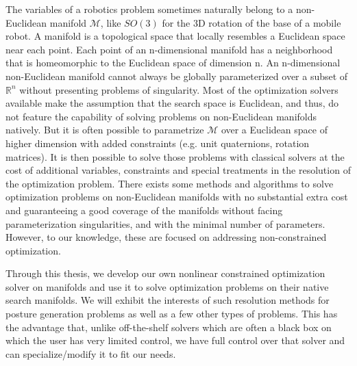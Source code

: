 The variables of a robotics problem sometimes naturally belong to a non-Euclidean manifold $\mathcal{M}$, like $SO(3)$ for the 3D rotation of the base of a mobile robot.
A manifold is a topological space that locally resembles a Euclidean space near each point.
Each point of an n-dimensional manifold has a neighborhood that is homeomorphic to the Euclidean space of dimension n.
An n-dimensional non-Euclidean manifold cannot always be globally parameterized over a subset of $\mathbb{R}^n$ without presenting problems of singularity.
Most of the optimization solvers available make the assumption that the search space is Euclidean, and thus, do not feature the capability of solving problems on non-Euclidean manifolds natively.
But it is often possible to parametrize $\mathcal{M}$ over a Euclidean space of higher dimension with added constraints (e.g. unit quaternions, rotation matrices).
It is then possible to solve those problems with classical solvers at the cost of additional variables, constraints and special treatments in the resolution of the optimization problem.
There exists some methods and algorithms to solve optimization problems on non-Euclidean manifolds with no substantial extra cost and guaranteeing a good coverage of the manifolds without facing parameterization singularities, and with the minimal number of parameters.
However, to our knowledge, these are focused on addressing non-constrained optimization.

Through this thesis, we develop our own nonlinear constrained optimization solver on manifolds and use it to solve optimization problems on their native search manifolds. We will exhibit the interests of such resolution methods for posture generation problems as well as a few other types of problems.
This has the advantage that, unlike off-the-shelf solvers which are often a black box on which the user has very limited control, we have full control over that solver and can specialize/modify it to fit our needs.

